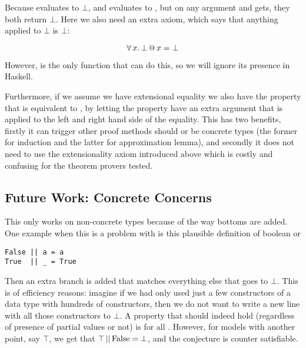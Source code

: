 Because  evaluates to $\bot$, and  evaluates
to \hs{()}, but on any argument  and  gets, they both
return $\bot$. Here we also need an extra axiom, which says that
anything applied to $\bot$ is $\bot$:

\begin{equation*}
\forall \, x . \, \bot \, @ \, x = \bot
\end{equation*}

However,  is the only function that can do this, so we will
ignore its presence in Haskell.

Furthermore, if we assume we have extensional equality we also have
the property that  is equivalent to
, by letting the property have an extra argument that
is applied to the left and right hand side of the equality. This has
two benefits, firstly it can trigger other proof methods should 
or  be concrete types (the former for induction and the latter
for approximation lemma), and secondly it does not need to use the
extensionality axiom introduced above which is costly and confusing
for the theorem provers tested.

\subsection{Future Work: Concrete Concerns}

This only works on non-concrete types because of the way bottoms are
added. One example when this is a problem with is this plausible
definition of boolean or

\begin{verbatim}
False || a = a
True  || _ = True
\end{verbatim}

Then an extra branch is added that matches everything else that goes
to $\bot$. This is of efficiency reasons: imagine if we had only used
just a few constructors of a data type with hundreds of constructors,
then we do not want to write a new line with all those constructors to
$\bot$. A property that should indeed hold (regardless of presence of
partial values or not) is  for all
. However, for models with another point, say $\top$, we get
that $\top \, \mathrm{||} \, \mathrm{False} = \bot$, and the conjecture is
counter satisfiable.

